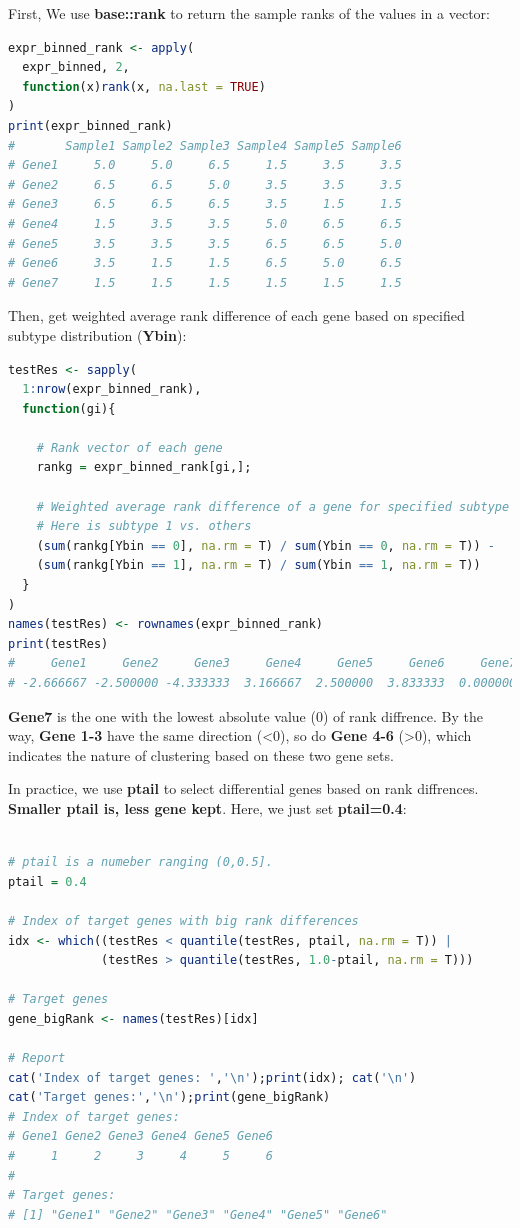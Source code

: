 \documentclass[
  12pt,
]{book}
\begin{document}
First, We use \textbf{base::rank} to return the sample ranks of the values in a vector:

\begin{lstlisting}[language=R]
expr_binned_rank <- apply(
  expr_binned, 2, 
  function(x)rank(x, na.last = TRUE)
)
print(expr_binned_rank)
#       Sample1 Sample2 Sample3 Sample4 Sample5 Sample6
# Gene1     5.0     5.0     6.5     1.5     3.5     3.5
# Gene2     6.5     6.5     5.0     3.5     3.5     3.5
# Gene3     6.5     6.5     6.5     3.5     1.5     1.5
# Gene4     1.5     3.5     3.5     5.0     6.5     6.5
# Gene5     3.5     3.5     3.5     6.5     6.5     5.0
# Gene6     3.5     1.5     1.5     6.5     5.0     6.5
# Gene7     1.5     1.5     1.5     1.5     1.5     1.5
\end{lstlisting}

Then, get weighted average rank difference of each gene based on specified subtype distribution (\textbf{Ybin}):

\begin{lstlisting}[language=R]
testRes <- sapply(
  1:nrow(expr_binned_rank), 
  function(gi){
    
    # Rank vector of each gene
    rankg = expr_binned_rank[gi,];
    
    # Weighted average rank difference of a gene for specified subtype 
    # Here is subtype 1 vs. others
    (sum(rankg[Ybin == 0], na.rm = T) / sum(Ybin == 0, na.rm = T)) - 
    (sum(rankg[Ybin == 1], na.rm = T) / sum(Ybin == 1, na.rm = T))
  }
)
names(testRes) <- rownames(expr_binned_rank)
print(testRes)
#     Gene1     Gene2     Gene3     Gene4     Gene5     Gene6     Gene7 
# -2.666667 -2.500000 -4.333333  3.166667  2.500000  3.833333  0.000000
\end{lstlisting}

\textbf{Gene7} is the one with the lowest absolute value (0) of rank diffrence. By the way, \textbf{Gene 1-3} have the same direction (\textless0), so do \textbf{Gene 4-6} (\textgreater0), which indicates the nature of clustering based on these two gene sets.

In practice, we use \textbf{ptail} to select differential genes based on rank diffrences. \textbf{Smaller ptail is, less gene kept}. Here, we just set \textbf{ptail=0.4}:

\begin{lstlisting}[language=R]

# ptail is a numeber ranging (0,0.5].
ptail = 0.4

# Index of target genes with big rank differences
idx <- which((testRes < quantile(testRes, ptail, na.rm = T)) | 
             (testRes > quantile(testRes, 1.0-ptail, na.rm = T)))

# Target genes
gene_bigRank <- names(testRes)[idx]

# Report
cat('Index of target genes: ','\n');print(idx); cat('\n')
cat('Target genes:','\n');print(gene_bigRank)
# Index of target genes:  
# Gene1 Gene2 Gene3 Gene4 Gene5 Gene6 
#     1     2     3     4     5     6 
# 
# Target genes: 
# [1] "Gene1" "Gene2" "Gene3" "Gene4" "Gene5" "Gene6"
\end{lstlisting}
\end{document}
